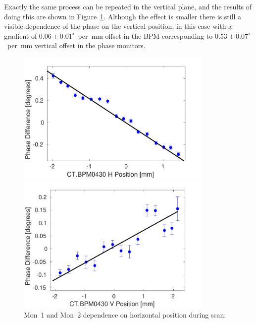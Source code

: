 Exactly the same process can be repeated in the vertical plane, and the results of doing this are shown in Figure~\ref{f:verticalScanFit}. Although the effect is smaller there is still a visible dependence of the phase on the vertical position, in this case with a gradient of \(0.06\pm0.01^\circ\)~per~mm offset in the BPM corresponding to \(0.53\pm0.07^\circ\)~per~mm vertical offset in the phase monitors.

\begin{figure}
  \centering
  \includegraphics[width=0.85\textwidth]{Figures/phaseMons/horizontalScanFit}
  \caption{Fit to difference between Mon~1 and Mon~2 phase versus horizontal position.}
  \label{f:horizontalScanFit}
  \includegraphics[width=0.85\textwidth]{Figures/phaseMons/verticalScanFit}
  \caption{Mon~1 and Mon~2 dependence on horizontal position during scan.}
  \label{f:verticalScanFit}
\end{figure}

